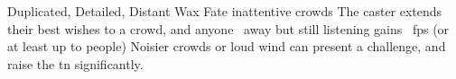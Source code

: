   {Duplicated, Detailed, Distant}%
  {Wax}%
  {Fate}%
  {inattentive crowds}%
  {The caster extends their best wishes to a crowd, and anyone \spellRange\ away but still listening gains \showDam~\glspl{fp} (or at least up to  people)}%
  {Noisier crowds or loud wind can present a challenge, and raise the \gls{tn} significantly.}
